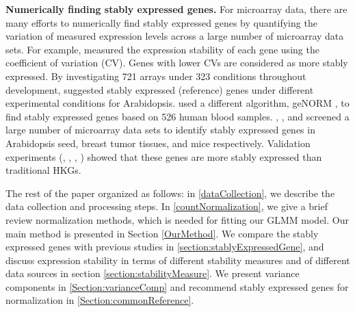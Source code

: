 \documentclass[11pt, a4paper]{article}
\begin{document}
\textbf{Numerically finding stably expressed genes.}
For microarray data, there are many efforts to numerically find stably
expressed genes by quantifying the variation of measured expression levels
across a large number of microarray data sets.  For example,
\cite{czechowski2005genome} measured the expression stability of each gene
using the coefficient of variation (CV). Genes with lower CVs are considered
as more stably expressed.  By investigating 721 arrays under 323 conditions
throughout development, \cite{czechowski2005genome} suggested stably expressed
(reference) genes under different experimental conditions for Arabidopsis.
\cite{stamova2009identification} used a different algorithm, geNORM
\citep{vandesompele2002accurate}, to find stably expressed genes based on 526
human blood samples. 
 \citet{dekkers2012identification}, \citet{gur2009identification}, and
 \citet{frericks2008toolbox} screened a large number of microarray data sets
 to identify stably expressed genes in Arabidopsis seed, breast tumor tissues,
 and mice respectively.
Validation experiments (\cite{czechowski2005genome},
\cite{dekkers2012identification}, \cite{huggett2005real},
\cite{stamova2009identification}) showed that these genes are more stably
expressed than traditional HKGs.  




The rest of the paper organized as follows: in \ref{dataCollection}, we describe the data collection and processing steps. In \ref{countNormalization}, we give a brief review normalization methods, which is needed for fitting our GLMM model. Our main method is presented in Section \ref{OurMethod}. We compare the stably expressed genes with previous studies in \ref{section:stablyExpressedGene}, and discuss expression stability in terms of different stability measures and of different data sources in section \ref{section:stabilityMeasure}. We present variance components in \ref{Section:varianceComp} and recommend stably expressed genes for normalization in \ref{Section:commonReference}.
\end{document}
